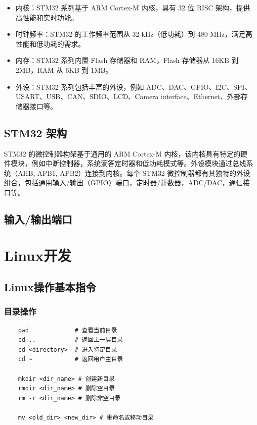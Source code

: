 \documentclass[12pt, a4paper, oneside]{ctexbook}
\numberwithin{figure}{section}
\begin{document}
\begin{itemize}
    \item 内核：STM32 系列基于 ARM Cortex-M 内核，具有 32 位 RISC 架构，提供高性能和实时功能。
    \item 时钟频率：STM32 的工作频率范围从 32 kHz（低功耗）到 480 MHz，满足高性能和低功耗的需求。
    \item 内存：STM32 系列内置 Flash 存储器和 RAM，Flash 存储器从 16KB 到 2MB，RAM 从 6KB 到 1MB。
    \item 外设：STM32 系列包括丰富的外设，例如 ADC、DAC、GPIO、I2C、SPI、USART、USB、CAN、SDIO、LCD、Camera interface、Ethernet、外部存储器接口等。
\end{itemize}

\section{STM32 架构}

STM32 的微控制器构架基于通用的 ARM Cortex-M 内核，该内核具有特定的硬件模块，例如中断控制器，系统滴答定时器和低功耗模式等。外设模块通过总线系统（AHB, APB1, APB2）连接到内核。每个 STM32 微控制器都有其独特的外设组合，包括通用输入/输出（GPIO）端口，定时器/计数器，ADC/DAC，通信接口等。

\section{输入/输出端口}



\chapter{Linux开发}

\section{Linux操作基本指令}

\subsection{目录操作}

\begin{verbatim}
    pwd             # 查看当前目录
    cd ..           # 返回上一层目录
    cd <directory>  # 进入特定目录
    cd ~            # 返回用户主目录

    mkdir <dir_name> # 创建新目录
    rmdir <dir_name> # 删除空目录
    rm -r <dir_name> # 删除非空目录

    mv <old_dir> <new_dir> # 重命名或移动目录
\end{verbatim}
\end{document}
